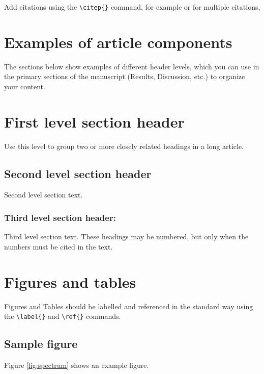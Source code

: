 \documentclass[10pt,twocolumn,twoside,lineno]{gsajnl}
\begin{document}
Add citations using the \verb|\citep{}| command, for example \citep{neher2013genealogies} or for multiple citations, \citep{neher2013genealogies, rodelsperger2014characterization,Falush16}

\section{Examples of article components}
\label{sec:examples}

The sections below show examples of different header levels, which you can use in the primary sections of the manuscript (Results, Discussion, etc.) to organize your content.

\section{First level section header}

Use this level to group two or more closely related headings in a long article.

\subsection{Second level section header}

Second level section text.

\subsubsection{Third level section header:}

Third level section text. These headings may be numbered, but only when the numbers must be cited in the text.

\section{Figures and tables}

Figures and Tables should be labelled and referenced in the standard way using the \verb|\label{}| and \verb|\ref{}| commands.

\subsection{Sample figure}

Figure \ref{fig:spectrum} shows an example figure.
\end{document}
